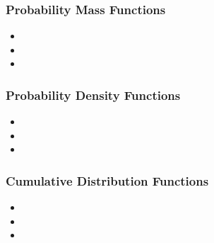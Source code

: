 \documentclass{beamer}
\begin{document}
\begin{frame}
\frametitle{Probability Mass Functions}
\Large
\begin{itemize}
\item
\item
\item
\end{itemize}
\end{frame}

\begin{frame}
\frametitle{Probability Density Functions}
\Large
\begin{itemize}
\item
\item
\item
\end{itemize}
\end{frame}
\begin{frame}
\frametitle{Cumulative Distribution Functions}
\Large
\begin{itemize}
\item
\item
\item
\end{itemize}
\end{frame}
\end{document}
